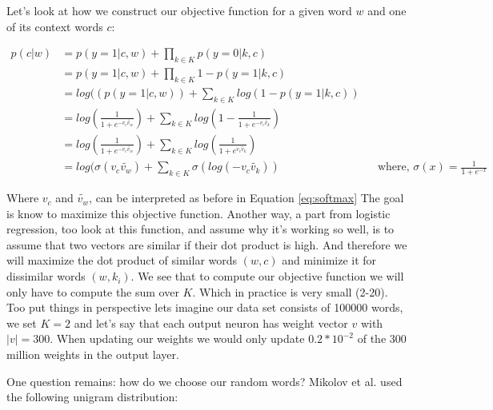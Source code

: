 {Let's look at how we construct our objective function for a given word $w$ and one of its context words $c$: 

\begin{align*}
p(c|w) &= p(y=1|c,w) + \prod_{k\in K} p(y=0|k,c) 
\\&= p(y=1|c,w) + \prod_{k\in K} 1- p(y=1|k,c) 
\\&= log((p(y=1|c,w)) + \sum_{k\in K} log(1- p(y=1|k,c)) 
\\&=  log(\frac{1}{1+e^{-v_c \tilde{v_w }}})  + \sum_{k\in K} log(1-\frac{1}{1+e^{-v_c \tilde{v_k}}}) 
\\&=  log(\frac{1}{1+e^{-v_c \tilde{v_w } }})  + \sum_{k\in K} log(\frac{1}{1+e^{v_c \tilde{v_k} }})
\\&= log(\sigma(v_c \tilde{v_w } ) + \sum_{k\in K} \sigma(log(-v_c \tilde{v_k} )) &&\text{where, $\sigma(x) = \frac{1}{1+e^{-x}}$}
\end{align*}\label{eq:obj_neg_samples}

Where $v_c$ and $\tilde{v_w }$, can be interpreted as before in Equation \ref{eq:softmax} The goal is know to maximize this objective function. Another way, a part from logistic regression, too look at this function, and assume why it's working so well, is to assume that two vectors are similar if their dot product is high. And therefore we will maximize the dot product of similar words $(w,c)$ and minimize it for dissimilar words $(w,k_i)$.
We see that to compute our objective function we will only have to compute the sum over $K$. Which in practice is very small (2-20). Too put things in perspective lets imagine our data set consists of 100000 words, we set $K=2$ and let's say that each output neuron has weight vector $v$ with $|v| = 300$. When updating our weights we would only update  $0.2*10^{-2}$ of the 300 million weights in the output layer. 

One question remains: how do we choose our random words? Mikolov et al. \cite{mikolov2} used the following unigram distribution:
 
}
